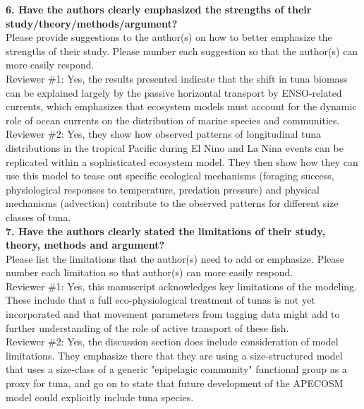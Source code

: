 \documentclass[12pt]{article}
\begin{document}
\textbf{6. Have the authors clearly emphasized the strengths of their study/theory/methods/argument?}\\

Please provide suggestions to the author(s) on how to better emphasize the strengths of their study. Please number each suggestion so that the author(s) can more easily respond. \\

Reviewer \#1: Yes, the results presented indicate that the shift in tuna biomass can be explained largely by the passive horizontal transport by ENSO-related currents, which emphasizes that ecosystem models must account for the dynamic role of ocean currents on the distribution of marine species and communities.\\

Reviewer \#2: Yes, they show how observed patterns of longitudinal tuna distributions in the tropical Pacific during El Nino and La Nina events can be replicated within a sophisticated ecosystem model. They then show how they can use this model to tease out specific ecological mechanisms (foraging success, physiological responses to temperature, predation pressure) and physical mechanisms (advection) contribute to the observed patterns for different size classes of tuna.\\

\textbf{7. Have the authors clearly stated the limitations of their study, theory, methods and argument?}\\

Please list the limitations that the author(s) need to add or emphasize. Please number each limitation so that author(s) can more easily respond.\\

Reviewer \#1: Yes, this manuscript acknowledges key limitations of the modeling. These include that a full eco-physiological treatment of tunas is not yet incorporated and that movement parameters from tagging data might add to further understanding of the role of active transport of these fish.\\

Reviewer \#2: Yes, the discussion section does include consideration of model limitations. They emphasize there that they are using a size-structured model that uses a size-class of a generic "epipelagic community" functional group as a proxy for tuna, and go on to state that future development of the APECOSM model could explicitly include tuna species.\\
\end{document}
